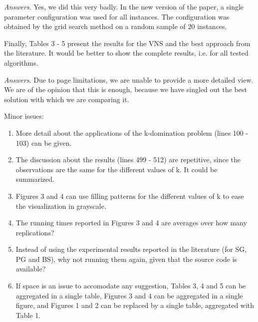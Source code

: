 \documentclass [11pt]{scrartcl}
\begin{document}
\emph{Answers}. Yes, we did this very badly. In the new version of the paper, a single parameter configuration was used for all instances. The configuration was obtained by the grid search method on a random sample of 20 instances.

\begin{leftbar}
Finally, Tables 3 - 5 present the results for the VNS and the best approach from the literature. It would be better to show the complete results, i.e. for all tested algorithms.
	
\end{leftbar}

\emph{Answers}. Due to page limitations, we are unable to provide a more detailed view. We are of the opinion that this is enough, because we have singled out the best solution with which we are comparing it.  


\begin{leftbar}
Minor issues:
\begin{enumerate}
  \item More detail about the applications of the k-domination problem (lines 100 - 103) can be given.
  \item The discussion about the results (lines 499 - 512) are repetitive, since the observations are the same for the different values of k. It could be summarized.
  \item Figures 3 and 4 can use filling patterns for the different values of k to ease the visualization in grayscale.
  \item The running times reported in Figures 3 and 4 are averages over how many replications?
  \item Instead of using the experimental results reported in the literature (for SG, PG and BS), why not running them again, given that the source code is available?
  \item If space is an issue to accomodate any suggestion, Tables 3, 4 and 5 can be aggregated in a single table, Figures 3 and 4 can be aggregated in a single figure, and Figures 1 and 2 can be replaced by a single table, aggregated with Table 1.
\end{enumerate}
    
    
\end{leftbar}
\end{document}
